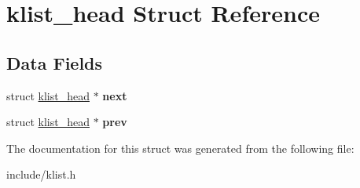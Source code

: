 \hypertarget{structklist__head}{}\section{klist\+\_\+head Struct Reference}
\label{structklist__head}
\subsection*{Data Fields}
\begin{DoxyCompactItemize}
\item 
\mbox{\label{structklist__head_aee06e317ee3fe9b07ca6a8b3ad46a69e}} 
struct \mbox{\hyperlink{structklist__head}{klist\+\_\+head}} $\ast$ {\bfseries next}
\item 
\mbox{\label{structklist__head_aad7097ddbbc2248a7696fa77b983307a}} 
struct \mbox{\hyperlink{structklist__head}{klist\+\_\+head}} $\ast$ {\bfseries prev}
\end{DoxyCompactItemize}


The documentation for this struct was generated from the following file\+:\begin{DoxyCompactItemize}
\item 
include/klist.\+h\end{DoxyCompactItemize}
